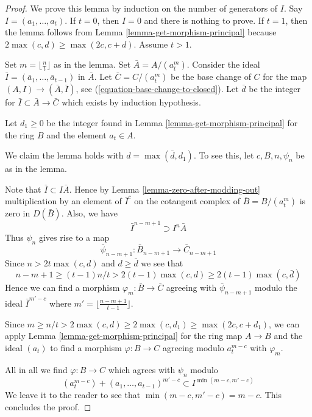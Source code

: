 \begin{proof}
We prove this lemma by induction on the number of generators of $I$.
Say $I = (a_1, \ldots, a_t)$. If $t = 0$, then $I = 0$ and there
is nothing to prove. If $t = 1$, then the lemma follows from
Lemma \ref{lemma-get-morphism-principal} because
$2\max(c, d) \geq \max(2c, c + d)$. Assume $t > 1$.

\medskip\noindent
Set $m = \lfloor \frac{n}{t} \rfloor$ as in the lemma.
Set $\bar A = A/(a_t^m)$. Consider the ideal
$\bar I = (\bar a_1, \ldots, \bar a_{t - 1})$ in $\bar A$.
Let $\bar C = C/(a_t^m)$ be the base change of $C$ for the
map $(A, I) \to (\bar A, \bar I)$, see (\ref{equation-base-change-to-closed}).
Let $\bar d$ be the integer for $\bar I \subset \bar A \to \bar C$
which exists by induction hypothesis.

\medskip\noindent
Let $d_1 \geq 0$ be the integer found in
Lemma \ref{lemma-get-morphism-principal} for the ring $B$
and the element $a_t \in A$.

\medskip\noindent
We claim the lemma holds with $d = \max(\bar d, d_1)$.
To see this, let $c, B, n, \psi_n$ be as in the lemma.

\medskip\noindent
Note that $\bar I \subset I\bar A$. Hence by
Lemma \ref{lemma-zero-after-modding-out}
multiplication by an element of $\bar I^c$
on the cotangent complex of $\bar B = B/(a_t^m)$
is zero in $D(\bar B)$. Also, we have
$$
\bar I^{n - m + 1} \supset I^n \bar A
$$
Thus $\psi_n$ gives rise to a map
$$
\bar \psi_{n - m + 1} : \bar B_{n - m + 1} \to \bar C_{n - m + 1}
$$
Since $n > 2t\max(c, d)$ and $d \geq \bar d$ we see that
$$
n - m + 1 \geq (t - 1)n/t > 2(t - 1)\max(c, d) \geq 2(t - 1)\max(c, \bar d)
$$
Hence we can find a morphism $\varphi_m : \bar B \to \bar C$
agreeing with $\bar \psi_{n - m + 1}$ modulo the ideal
$\bar I^{m' - c}$ where $m' = \lfloor \frac{n - m + 1}{t - 1} \rfloor$.

\medskip\noindent
Since $m \geq n/t > 2\max(c, d) \geq 2\max(c, d_1) \geq \max(2c, c+ d_1)$,
we can apply Lemma \ref{lemma-get-morphism-principal} for
the ring map $A \to B$ and the ideal $(a_t)$ to
find a morphism $\varphi : B \to C$ agreeing modulo
$a_t^{m - c}$ with $\varphi_m$.

\medskip\noindent
All in all we find $\varphi : B \to C$ which agrees with
$\psi_n$ modulo
$$
(a_t^{m - c}) + (a_1, \ldots, a_{t - 1})^{m' - c}
\subset I^{\min(m - c, m' - c)}
$$
We leave it to the reader to see that
$\min(m - c, m' - c) = m - c$. This concludes the proof.
\end{proof}

